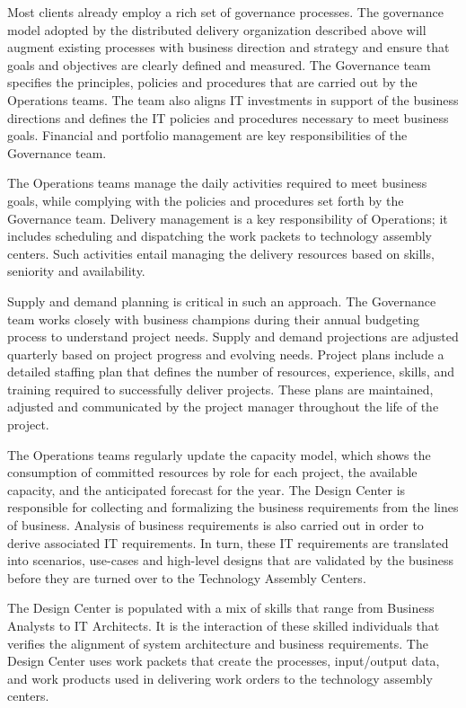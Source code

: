 Most clients already employ a rich set of governance processes. The governance model adopted by the distributed delivery organization described above will augment existing processes with business direction and strategy and ensure that goals and objectives are clearly defined and measured. The Governance team specifies the principles, policies and procedures that are carried out by the Operations teams. The team also aligns IT investments in support of the business directions and defines the IT policies and procedures necessary to meet business goals. Financial and portfolio management are key responsibilities of the Governance team.

The Operations teams manage the daily activities required to meet business goals, while complying with the policies and procedures set forth by the Governance team. Delivery management is a key responsibility of Operations; it includes scheduling and dispatching the work packets to technology assembly centers. Such activities entail managing the delivery resources based on skills, seniority and availability.

Supply and demand planning is critical in such an approach. The Governance team works closely with business champions during their annual budgeting process to understand project needs. Supply and demand projections are adjusted quarterly based on project progress and evolving needs. Project plans include a detailed staffing plan that defines the number of resources, experience, skills, and training required to successfully deliver projects. These plans are maintained, adjusted and communicated by the project manager throughout the life of the project.

The Operations teams regularly update the capacity model, which shows the consumption of committed resources by role for each project, the available capacity, and the anticipated forecast for the year. The Design Center is responsible for collecting and formalizing the business requirements from the lines of business. Analysis of business requirements is also carried out in order to derive associated IT requirements. In turn, these IT requirements are translated into scenarios, use-cases and high-level designs that are validated by the business before they are turned over to the Technology Assembly Centers.

The Design Center is populated with a mix of skills that range from Business Analysts to IT Architects. It is the interaction of these skilled individuals that verifies the alignment of system architecture and business requirements. The Design Center uses work packets that create the processes, input/output data, and work products used in delivering work orders to the technology assembly centers.

